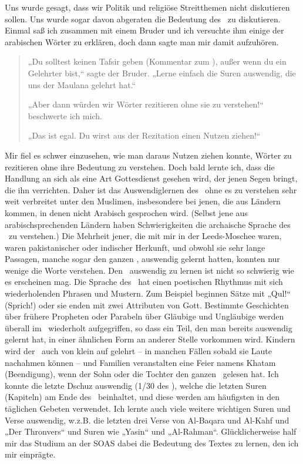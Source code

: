 \documentclass[12pt]{memoir}
\begin{document}
Uns wurde gesagt, dass wir Politik und religiöse Streitthemen
nicht diskutieren sollen.
Uns wurde sogar davon abgeraten die Bedeutung des \Quran\ zu diskutieren.
Einmal saß ich zusammen mit einem Bruder und ich versuchte ihm einige
der arabischen Wörter zu erklären, doch dann sagte man mir damit aufzuhören.

\begin{quote}
„Du solltest keinen Tafsir geben (Kommentar zum \Quran),
außer wenn du ein Gelehrter bist,“ sagte der Bruder.
„Lerne einfach die Suren auswendig, die uns der Maulana gelehrt hat.“

„Aber dann würden wir Wörter rezitieren ohne sie zu verstehen!“
beschwerte ich mich.

„Das ist egal. Du wirst aus der Rezitation einen Nutzen ziehen!“
\end{quote}

Mir fiel es schwer einzusehen, wie man daraus Nutzen ziehen konnte,
Wörter zu rezitieren ohne ihre Bedeutung zu verstehen.
Doch bald lernte ich, dass die Handlung an sich
als eine Art Gottesdienst gesehen wird,
der jenen Segen bringt, die ihn verrichten.
Daher ist das Auswendiglernen des \Quran\ ohne es zu verstehen
sehr weit verbreitet unter den Muslimen, insbesondere bei jenen,
die aus Ländern kommen, in denen nicht Arabisch gesprochen wird.
(Selbst jene aus arabischsprechenden Ländern haben Schwierigkeiten
die archaische Sprache des \Quran\ zu verstehen.)
Die Mehrheit jener, die mit mir in der Leeds-Moschee waren,
waren pakistanischer oder indischer Herkunft,
und obwohl sie sehr lange Passagen, manche sogar den ganzen \Quran,
auswendig gelernt hatten, konnten nur wenige die Worte verstehen.
Den \Quran\ auswendig zu lernen ist nicht so schwierig wie es erscheinen mag.
Die Sprache des \Quran\ hat einen poetischen Rhythmus
mit sich wiederholenden Phrasen und Mustern.
Zum Beispiel beginnen Sätze mit „Qul!“ (Sprich!)
oder sie enden mit zwei Attributen von Gott.
Bestimmte Geschichten über frühere Propheten oder Parabeln
über Gläubige und Ungläubige werden überall im \Quran\ wiederholt aufgegriffen,
so dass ein Teil, den man bereits auswendig gelernt hat,
in einer ähnlichen Form an anderer Stelle vorkommen wird.
Kindern wird der \Quran\ auch von klein auf gelehrt –
in manchen Fällen sobald sie Laute nachahmen können –
und Familien veranstalten eine Feier namens Khatam (Beendigung),
wenn der Sohn oder die Tochter den ganzen \Quran\ gelesen hat.
Ich konnte die letzte Dschuz\´ auswendig (1/30 des \Quran),
welche die letzten Suren (Kapiteln) am Ende des \Quran\ beinhaltet,
und diese werden am häufigsten in den täglichen Gebeten verwendet.
Ich lernte auch viele weitere wichtigen Suren und Verse auswendig,
w.z.B. die letzten drei Verse von Al-Baqara und Al-Kahf und „Der Thronvers“
und Suren wie „Yasin“ und „Al-Rahman“.
Glücklicherweise half mir das Studium an der SOAS dabei
die Bedeutung des Textes zu lernen, den ich mir einprägte.
\end{document}
